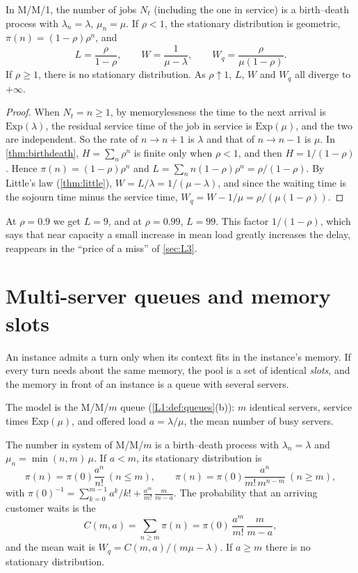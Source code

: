 \begin{proposition}\label{prop:mm1}
In M/M/1, the number of jobs $N_t$ (including the one in service) is a birth--death
process with $\lambda_n=\lambda$, $\mu_n=\mu$. If $\rho<1$, the stationary
distribution is geometric, $\pi(n)=(1-\rho)\rho^n$, and
\[
  L=\frac{\rho}{1-\rho},\qquad W=\frac{1}{\mu-\lambda},\qquad W_q=\frac{\rho}{\mu(1-\rho)} .
\]
If $\rho\ge1$, there is no stationary distribution. As $\rho\uparrow1$, $L$, $W$ and
$W_q$ all diverge to $+\infty$.
\end{proposition}
\begin{proof}
When $N_t=n\ge1$, by memorylessness the time to the next arrival is $\mathrm{Exp}(\lambda)$,
the residual service time of the job in service is $\mathrm{Exp}(\mu)$, and the two are
independent. So the rate of $n\to n+1$ is $\lambda$ and that of $n\to n-1$ is $\mu$.
In \cref{thm:birthdeath}, $H=\sum_n\rho^n$ is finite only when $\rho<1$, and then
$H=1/(1-\rho)$. Hence $\pi(n)=(1-\rho)\rho^n$ and
$L=\sum_n n(1-\rho)\rho^n=\rho/(1-\rho)$. By Little's law (\cref{thm:little}),
$W=L/\lambda=1/(\mu-\lambda)$, and since the waiting time is the sojourn time minus the
service time, $W_q=W-1/\mu=\rho/(\mu(1-\rho))$.
\end{proof}

At $\rho=0.9$ we get $L=9$, and at $\rho=0.99$, $L=99$. This factor $1/(1-\rho)$, which
says that near capacity a small increase in mean load greatly increases the delay,
reappears in the ``price of a miss'' of \cref{sec:L3}.

\section{Multi-server queues and memory slots}\label{L2:sec:mmm}

An instance admits a turn only when its context fits in the instance's memory. If every
turn needs about the same memory, the pool is a set of identical \emph{slots}, and the
memory in front of an instance is a queue with several servers.

The model is the M/M/$m$ queue (\cref{L1:def:queues}(b)): $m$ identical servers,
service times $\mathrm{Exp}(\mu)$, and offered load $a=\lambda/\mu$, the mean number of
busy servers.

\begin{proposition}\label{prop:mmm}
The number in system of M/M/$m$ is a birth--death process with $\lambda_n=\lambda$ and
$\mu_n=\min(n,m)\,\mu$. If $a<m$, its stationary distribution is
\[
  \pi(n)=\pi(0)\frac{a^n}{n!}\ (n\le m),\qquad
  \pi(n)=\pi(0)\frac{a^n}{m!\,m^{n-m}}\ (n\ge m),
\]
with $\pi(0)^{-1}=\sum_{k=0}^{m-1}a^k/k!+\frac{a^m}{m!}\,\frac{m}{m-a}$.
The probability that an arriving customer waits is the 
\[
  C(m,a)=\sum_{n\ge m}\pi(n)=\pi(0)\,\frac{a^m}{m!}\,\frac{m}{m-a},
\]
and the mean wait is $W_q=C(m,a)/(m\mu-\lambda)$. If $a\ge m$ there is no stationary
distribution.
\end{proposition}

